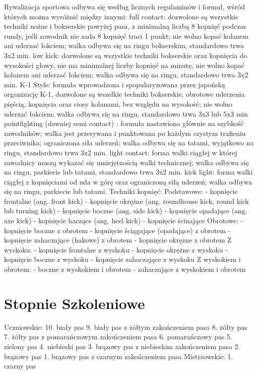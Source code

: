 \documentclass[14pt,oneside,a4paper]{book}
\theoremstyle{break}
\begin{document}
	Rywalizacja sportowa odbywa się według licznych regulaminów i formuł, wśród których można wyróżnić między innymi:
full contact: dozwolone są wszystkie techniki nożne i bokserskie powyżej pasa, z minimalną liczbą 8 kopnięć podczas rundy, jeśli zawodnik nie zada 8 kopnięć traci 1 punkt; nie wolno kopać kolanem ani uderzać łokciem; walka odbywa się na ringu bokserskim, standardowo trwa 3x2 min.
low kick: dozwolone są wszystkie techniki bokserskie oraz kopnięcia do wysokości głowy, nie ma minimalnej liczby kopnięć na minutę, nie wolno kopać kolanem ani uderzać łokciem; walka odbywa się na ringu, standardowo trwa 3x2 min.
K-1 Style: formuła wprowadzona i spopularyzowana przez japońską organizację K-1, dozwolone są wszelkie techniki bokserskie, obrotowe uderzenia pięścią, kopnięcia oraz ciosy kolanami, bez względu na wysokość; nie wolno uderzać łokciem; walka odbywa się na ringu, standardowo trwa 3x3 lub 5x3 min
pointfighting (dawniej semi contact) : formuła nastawiona głównie na szybkość zawodników; walka jest przerywana i punktowana po każdym czystym trafieniu przeciwnika; ograniczona siła uderzeń; walka odbywa się na tatami, wyjątkowo na ringu, standardowo trwa 3x2 min.
light contact: forma walki ciągłej w której zawodnicy muszą wykazać się umiejętnością walki technicznej; walka odbywa się na ringu, parkiecie lub tatami, standardowo trwa 3x2 min.
kick light: forma walki ciągłej z kopnięciami od uda w górę oraz ograniczoną siłą uderzeń; walka odbywa się na ringu, parkiecie lub tatami.
Techniki kopnięć:
	Podstawowe:
- kopnięcie frontalne (ang. front kick)
- kopnięcie okrężne (ang. roundhouse kick, round kick lub turning kick)
- kopnięcie boczne (ang. side kick)
- kopnięcie opadające (ang. axe kick)
- kopnięcie haczące (ang. heel kick)
- kopnięcie ścinające
	Obrotowe:
- kopnięcie boczne z obrotem
- kopnięcie ściągające (opadające) z obrotem
- kopnięcie zahaczające (hakowe) z obrotem
- kopnięcie okrężne z obrotem
	Z wyskoku:
- kopnięcie frontalne z wyskoku
- kopnięcie okrężne z wyskoku
- kopnięcie boczne z wyskoku
- kopnięcie zahaczające z wyskoku
	Z wyskokiem i obrotem:
- boczne z wyskokiem i obrotem
- zahaczające z wyskokiem i obrotem

\section {Stopnie Szkoleniowe}

	Uczniowskie:
10. biały pas
9. biały pas z żółtym zakończeniem pasa
8. żółty pas
7. żółty pas z pomarańczowym zakończeniem pasa
6. pomarańczowy pas
5. zielony pas
4. niebieski pas
3. brązowy pas z niebieskim zakończeniem pasa
2. brązowy pas
1. brązowy pas z czarnym zakończeniem pasa
	Mistrzowskie:
1. czarny pas
\end{document}
